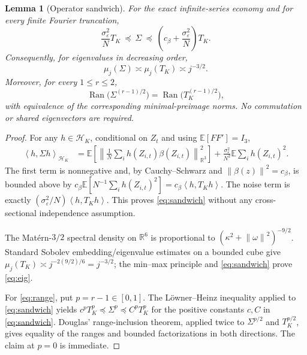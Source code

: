 \documentclass[11pt,a4paper]{article}
\newtheorem{lemma}[theorem]{Lemma}
\theoremstyle{remark}
\newcommand{\E}{\mathbb E}
\newcommand{\R}{\mathbb R}
\newcommand{\Hh}{\mathcal H_K}
\newcommand{\Ran}{\operatorname{Ran}}
\newcommand{\norm}[1]{\left\lVert#1\right\rVert}
\newcommand{\ip}[2]{\left\langle#1,#2\right\rangle}
\begin{document}
\begin{lemma}[Operator sandwich]\label{lem:sandwich}
For the exact infinite-series economy and for every finite Fourier truncation,
\begin{equation}\label{eq:sandwich}
 \frac{\sigma_\varepsilon^2}{N}T_K
 \ \preceq\ \Sigma\ \preceq\
 \left(c_\beta+\frac{\sigma_\varepsilon^2}{N}\right)T_K.
\end{equation}
Consequently, for eigenvalues in decreasing order,
\begin{equation}\label{eq:eig}
 \mu_j(\Sigma)\asymp\mu_j(T_K)\asymp j^{-3/2}.
\end{equation}
Moreover, for every $1\le r\le2$,
\begin{equation}\label{eq:range}
 \Ran\bigl(\Sigma^{(r-1)/2}\bigr)
 =\Ran\bigl(T_K^{(r-1)/2}\bigr),
\end{equation}
with equivalence of the corresponding minimal-preimage norms. No commutation or shared eigenvectors are required.
\end{lemma}
\begin{proof}
For any $h\in\Hh$, conditional on $Z_t$ and using $\E[FF']=I_3$,
\begin{align*}
 \ip{h}{\Sigma h}_{\Hh}
 &=\E\!\left[\norm{\frac1N\sum_i h(Z_{i,t})\beta(Z_{i,t})}_{\R^3}^2\right]
 +\frac{\sigma_\varepsilon^2}{N^2}\E\sum_i h(Z_{i,t})^2. 
\end{align*}
The first term is nonnegative and, by Cauchy--Schwarz and
$\norm{\beta(z)}^2=c_\beta$, is bounded above by
$c_\beta\E[N^{-1}\sum_i h(Z_{i,t})^2]=c_\beta\ip{h}{T_Kh}$.
The noise term is exactly $(\sigma_\varepsilon^2/N)\ip{h}{T_Kh}$. This proves \eqref{eq:sandwich} without any cross-sectional independence assumption.

The Mat\'ern-$3/2$ spectral density on $\R^6$ is proportional to
$(\kappa^2+\norm{\omega}^2)^{-9/2}$. Standard Sobolev embedding/eigenvalue estimates on a bounded cube give $\mu_j(T_K)\asymp j^{-2(9/2)/6}=j^{-3/2}$; the min--max principle and \eqref{eq:sandwich} prove \eqref{eq:eig}.

For \eqref{eq:range}, put $p=r-1\in[0,1]$. The L\"owner--Heinz inequality applied to \eqref{eq:sandwich} yields $c^p T_K^p\preceq\Sigma^p\preceq C^p T_K^p$ for the positive constants $c,C$ in \eqref{eq:sandwich}. Douglas' range-inclusion theorem, applied twice to $\Sigma^{p/2}$ and $T_K^{p/2}$, gives equality of the ranges and bounded factorizations in both directions. The claim at $p=0$ is immediate.
\end{proof}
\end{document}
